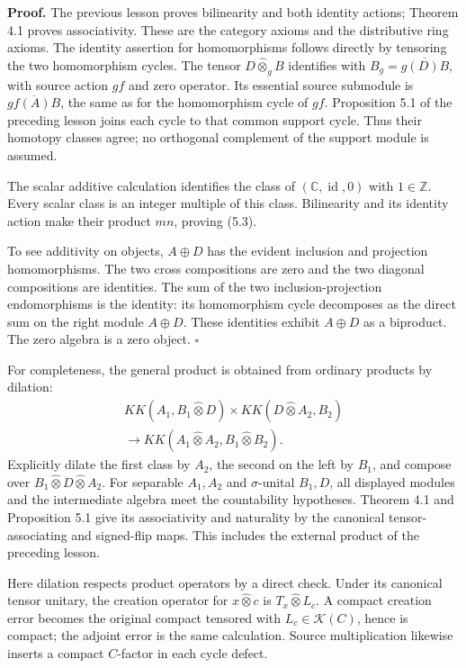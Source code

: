 \documentclass[
  11pt,
]{article}
\begin{document}
\textbf{Proof.} The previous lesson proves bilinearity and both identity
actions; Theorem 4.1 proves associativity. These are the category axioms
and the distributive ring axioms. The identity assertion for
homomorphisms follows directly by tensoring the two homomorphism cycles.
The tensor \(D\widehat\otimes_g B\) identifies with
\(B_g=\overline{g(D)B}\), with source action \(g f\) and zero operator.
Its essential source submodule is \(\overline{g f(A)B}\), the same as
for the homomorphism cycle of \(g f\). Proposition 5.1 of the preceding
lesson joins each cycle to that common support cycle. Thus their
homotopy classes agree; no orthogonal complement of the support module
is assumed.

The scalar additive calculation identifies the class of
\((\mathbb C,\operatorname{id},0)\) with \(1\in\mathbb Z\). Every scalar
class is an integer multiple of this class. Bilinearity and its identity
action make their product \(m n\), proving (5.3).

To see additivity on objects, \(A\oplus D\) has the evident inclusion
and projection homomorphisms. The two cross compositions are zero and
the two diagonal compositions are identities. The sum of the two
inclusion-projection endomorphisms is the identity: its homomorphism
cycle decomposes as the direct sum on the right module \(A\oplus D\).
These identities exhibit \(A\oplus D\) as a biproduct. The zero algebra
is a zero object. \(\square\)

For completeness, the general product is obtained from ordinary products
by dilation: \[
\begin{aligned}
KK(A_1,B_1\widehat\otimes D)\times
KK(D\widehat\otimes A_2,B_2)\\
\longrightarrow KK(A_1\widehat\otimes A_2,B_1\widehat\otimes B_2).
\end{aligned}
\tag{5.4}
\] Explicitly dilate the first class by \(A_2\), the second on the left
by \(B_1\), and compose over
\(B_1\widehat\otimes D\widehat\otimes A_2\). For separable \(A_1,A_2\)
and \(\sigma\)-unital \(B_1,D\), all displayed modules and the
intermediate algebra meet the countability hypotheses. Theorem 4.1 and
Proposition 5.1 give its associativity and naturality by the canonical
tensor-associating and signed-flip maps. This includes the external
product of the preceding lesson.

Here dilation respects product operators by a direct check. Under its
canonical tensor unitary, the creation operator for
\(x\widehat\otimes c\) is \(T_x\widehat\otimes L_c\). A compact creation
error becomes the original compact tensored with
\(L_c\in\mathcal K(C)\), hence is compact; the adjoint error is the same
calculation. Source multiplication likewise inserts a compact
\(C\)-factor in each cycle defect.
\end{document}
